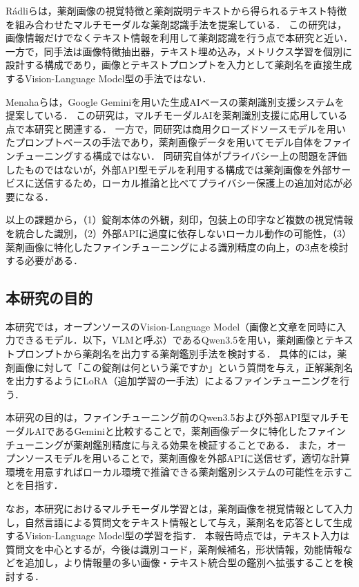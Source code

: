 \documentclass[dvipdfmx]{jsarticle}
\begin{document}
Rádliら\cite{radli2024metric}は，薬剤画像の視覚特徴と薬剤説明テキストから得られるテキスト特徴を組み合わせたマルチモーダルな薬剤認識手法を提案している．
この研究は，画像情報だけでなくテキスト情報を利用して薬剤認識を行う点で本研究と近い．
一方で，同手法は画像特徴抽出器，テキスト埋め込み，メトリクス学習を個別に設計する構成であり，画像とテキストプロンプトを入力として薬剤名を直接生成するVision-Language Model型の手法ではない．

Menahaら\cite{gemini2024pill}は，Google Geminiを用いた生成AIベースの薬剤識別支援システムを提案している．
この研究は，マルチモーダルAIを薬剤識別支援に応用している点で本研究と関連する．
一方で，同研究は商用クローズドソースモデルを用いたプロンプトベースの手法であり，薬剤画像データを用いてモデル自体をファインチューニングする構成ではない．
同研究自体がプライバシー上の問題を評価したものではないが，外部API型モデルを利用する構成では薬剤画像を外部サービスに送信するため，ローカル推論と比べてプライバシー保護上の追加対応が必要になる．

以上の課題から，（1）錠剤本体の外観，刻印，包装上の印字など複数の視覚情報を統合した識別，（2）外部APIに過度に依存しないローカル動作の可能性，（3）薬剤画像に特化したファインチューニングによる識別精度の向上，の3点を検討する必要がある．

\subsection{本研究の目的}

本研究では，オープンソースのVision-Language Model（画像と文章を同時に入力できるモデル．以下，VLMと呼ぶ）であるQwen3.5を用い，薬剤画像とテキストプロンプトから薬剤名を出力する薬剤鑑別手法を検討する．
具体的には，薬剤画像に対して「この錠剤は何という薬ですか」という質問を与え，正解薬剤名を出力するようにLoRA（追加学習の一手法）によるファインチューニングを行う．

本研究の目的は，ファインチューニング前のQwen3.5および外部API型マルチモーダルAIであるGeminiと比較することで，薬剤画像データに特化したファインチューニングが薬剤鑑別精度に与える効果を検証することである．
また，オープンソースモデルを用いることで，薬剤画像を外部APIに送信せず，適切な計算環境を用意すればローカル環境で推論できる薬剤鑑別システムの可能性を示すことを目指す．

なお，本研究におけるマルチモーダル学習とは，薬剤画像を視覚情報として入力し，自然言語による質問文をテキスト情報として与え，薬剤名を応答として生成するVision-Language Model型の学習を指す．
本報告時点では，テキスト入力は質問文を中心とするが，今後は識別コード，薬剤候補名，形状情報，効能情報などを追加し，より情報量の多い画像・テキスト統合型の鑑別へ拡張することを検討する．
\end{document}
